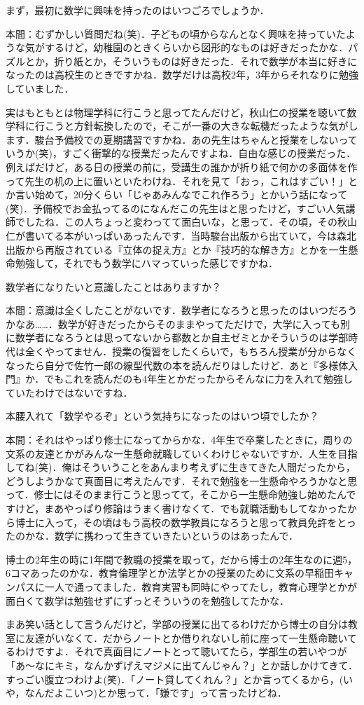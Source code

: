 \documentclass[uplatex]{jsarticle}
\begin{document}
まず，最初に数学に興味を持ったのはいつごろでしょうか．

本間：むずかしい質問だね(笑)．子どもの頃からなんとなく興味を持っていたような気がするけど，幼稚園のときくらいから図形的なものは好きだったかな．パズルとか，折り紙とか，そういうものは好きだった．それで数学が本当に好きになったのは高校生のときですかね．数学だけは高校2年，3年からそれなりに勉強していました．

実はもともとは物理学科に行こうと思ってたんだけど，秋山仁の授業を聴いて数学科に行こうと方針転換したので，そこが一番の大きな転機だったような気がします．駿台予備校での夏期講習ですかね．あの先生はちゃんと授業をしないっていうか(笑)，すごく衝撃的な授業だったんですよね．自由な感じの授業だった．例えばだけど，ある日の授業の前に，受講生の誰かが折り紙で何かの多面体を作って先生の机の上に置いといたわけね．それを見て「おっ，これはすごい！」とか言い始めて，20分くらい「じゃあみんなでこれ作ろう」とかいう話になって(笑)．予備校でお金払ってるのになんだこの先生はと思ったけど，すごい人気講師でしたね．この人ちょっと変わってて面白いな，と思って．その頃，その秋山仁が書いてる本がいっぱいあったんです．当時駿台出版から出ていて，今は森北出版から再版されている『立体の捉え方』とか『技巧的な解き方』とかを一生懸命勉強して，それでもう数学にハマっていった感じですかね．

数学者になりたいと意識したことはありますか？

本間：意識は全くしたことがないです．数学者になろうと思ったのはいつだろうかなあ……．数学が好きだったからそのままやってただけで，大学に入っても別に数学者になろうとは思ってないから都数とか自主ゼミとかそういうのは学部時代は全くやってません．授業の復習をしたくらいで，もちろん授業が分からなくなったら自分で佐竹一郎の線型代数の本を読んだりはしたけど．あと『多様体入門』か．でもこれを読んだのも4年生とかだったからそんなに力を入れて勉強していたわけではないですね．

本腰入れて「数学やるぞ」という気持ちになったのはいつ頃でしたか？

本間：それはやっぱり修士になってからかな．4年生で卒業したときに，周りの文系の友達とかがみんな一生懸命就職していくわけじゃないですか．人生を目指してね(笑)．俺はそういうことをあんまり考えずに生きてきた人間だったから，どうしようかなて真面目に考えたんです．それで勉強を一生懸命やろうかなと思って．修士にはそのまま行こうと思ってて，そこから一生懸命勉強し始めたんですけど，まあやっぱり修論はうまく書けなくて．でも就職活動もしてなかったから博士に入って，その頃はもう高校の数学教員になろうと思って教員免許をとったのかな．数学に携わって生きていきたいというのはあったんで．

博士の2年生の時に1年間で教職の授業を取って，だから博士の2年生なのに週5，6コマあったのかな．教育倫理学とか法学とかの授業のために文系の早稲田キャンパスに一人で通ってました．教育実習も同時にやってたし，教育心理学とかが面白くて数学は勉強せずにずっとそういうのを勉強してたかな．

まあ笑い話として言うんだけど，学部の授業に出てるわけだから博士の自分は教室に友達がいなくて．だからノートとか借りれないし前に座って一生懸命聴いてるわけですよ．それで真面目にノートとって聴いてたら，学部生の若いやつが「あ～なにキミ，なんかずげえマジメに出てんじゃん？」とか話しかけてきて．すっごい腹立つわけよ(笑)．「ノート貸してくれん？」とか言ってくるから，(いや，なんだよこいつ)とか思って．「嫌です」って言ったけどね．
\end{document}
